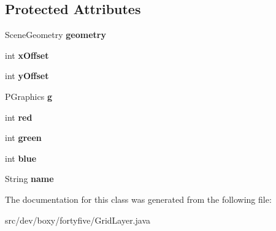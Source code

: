 \subsection*{Protected Attributes}
\begin{DoxyCompactItemize}
\item 
\hypertarget{classdev_1_1boxy_1_1fortyfive_1_1_grid_layer_a16aa42b82831adb6ea9dfe01bfb5ef0a}{
SceneGeometry {\bfseries geometry}}
\label{d4/d48/classdev_1_1boxy_1_1fortyfive_1_1_grid_layer_a16aa42b82831adb6ea9dfe01bfb5ef0a}

\item 
\hypertarget{classdev_1_1boxy_1_1fortyfive_1_1_grid_layer_a5d4427b7c4e36fb8d081570a55e1bf3b}{
int {\bfseries xOffset}}
\label{d4/d48/classdev_1_1boxy_1_1fortyfive_1_1_grid_layer_a5d4427b7c4e36fb8d081570a55e1bf3b}

\item 
\hypertarget{classdev_1_1boxy_1_1fortyfive_1_1_grid_layer_af8922944180375a451a17dd6235f2ffc}{
int {\bfseries yOffset}}
\label{d4/d48/classdev_1_1boxy_1_1fortyfive_1_1_grid_layer_af8922944180375a451a17dd6235f2ffc}

\item 
\hypertarget{classdev_1_1boxy_1_1fortyfive_1_1_grid_layer_a133a13d316aa3e04a95c9ad40554d2bd}{
PGraphics {\bfseries g}}
\label{d4/d48/classdev_1_1boxy_1_1fortyfive_1_1_grid_layer_a133a13d316aa3e04a95c9ad40554d2bd}

\item 
\hypertarget{classdev_1_1boxy_1_1fortyfive_1_1_grid_layer_a4c8a1b21ebbbf5a60db206694f46b510}{
int {\bfseries red}}
\label{d4/d48/classdev_1_1boxy_1_1fortyfive_1_1_grid_layer_a4c8a1b21ebbbf5a60db206694f46b510}

\item 
\hypertarget{classdev_1_1boxy_1_1fortyfive_1_1_grid_layer_a0f2e6380b9ffc27324a1afba83f9de77}{
int {\bfseries green}}
\label{d4/d48/classdev_1_1boxy_1_1fortyfive_1_1_grid_layer_a0f2e6380b9ffc27324a1afba83f9de77}

\item 
\hypertarget{classdev_1_1boxy_1_1fortyfive_1_1_grid_layer_a5ac6e77a3750a0f8ce5445bb99d26277}{
int {\bfseries blue}}
\label{d4/d48/classdev_1_1boxy_1_1fortyfive_1_1_grid_layer_a5ac6e77a3750a0f8ce5445bb99d26277}

\item 
\hypertarget{classdev_1_1boxy_1_1fortyfive_1_1_grid_layer_a3f10fdcd781a03eba46e51145b1be7b2}{
String {\bfseries name}}
\label{d4/d48/classdev_1_1boxy_1_1fortyfive_1_1_grid_layer_a3f10fdcd781a03eba46e51145b1be7b2}

\end{DoxyCompactItemize}


The documentation for this class was generated from the following file:\begin{DoxyCompactItemize}
\item 
src/dev/boxy/fortyfive/GridLayer.java\end{DoxyCompactItemize}
